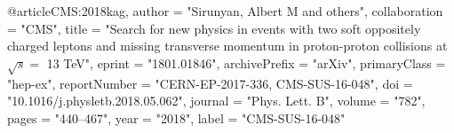 @article{CMS:2018kag,
    author = "Sirunyan, Albert M and others",
    collaboration = "CMS",
    title = "{Search for new physics in events with two soft oppositely charged leptons and missing transverse momentum in proton-proton collisions at $\sqrt{s}=$ 13 TeV}",
    eprint = "1801.01846",
    archivePrefix = "arXiv",
    primaryClass = "hep-ex",
    reportNumber = "CERN-EP-2017-336, CMS-SUS-16-048",
    doi = "10.1016/j.physletb.2018.05.062",
    journal = "Phys. Lett. B",
    volume = "782",
    pages = "440--467",
    year = "2018",
    label = "CMS-SUS-16-048"
}

